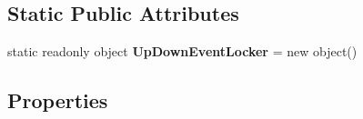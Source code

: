 \subsection*{Static Public Attributes}
\begin{DoxyCompactItemize}
\item 
\hypertarget{class_cloud_api_public_1_1_model_1_1_file_change_acb806601af19f3fd48c2ccd78d1438fd}{static readonly object {\bfseries Up\-Down\-Event\-Locker} = new object()}\label{class_cloud_api_public_1_1_model_1_1_file_change_acb806601af19f3fd48c2ccd78d1438fd}

\end{DoxyCompactItemize}
\subsection*{Properties}
